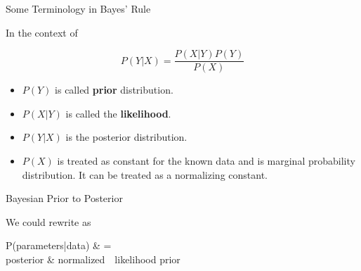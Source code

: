 \documentclass[aspectratio=169,xcolor=dvipsnames,svgnames,x11names,fleqn]{beamer}
\begin{document}
\begin{frame}{Some Terminology in Bayes' Rule}

    In the context of 

    $$
    P(Y|X) = \frac{P(X|Y)P(Y)}{P(X)}
    $$

    \begin{itemize}
        \item $P(Y)$ is called \textbf{prior} distribution.
        \item $P(X|Y)$ is called the \textbf{likelihood}.
        \item $P(Y|X)$ is the posterior distribution.
        \item $P(X)$ is treated as constant for the known data and is marginal probability distribution. It can  be treated as a normalizing constant.
    \end{itemize}
\end{frame}

\begin{frame}{Bayesian Prior to Posterior}

    We could rewrite as

    \begin{tblockWing}{}
        \begin{center}
            \begin{multiequation}
                P(parameters|data) & = \\
                posterior & \propto  normalized~~likelihood \times prior
            \end{multiequation}
        \end{center}
    \end{tblockWing}
    
\end{frame}
\end{document}
